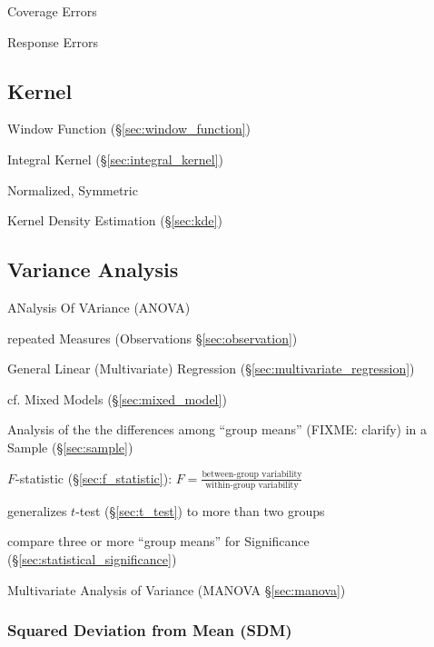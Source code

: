 Coverage Errors

Response Errors



\subsection{Kernel}\label{sec:distribution_kernel}

Window Function (\S\ref{sec:window_function})

\fist Integral Kernel (\S\ref{sec:integral_kernel})

Normalized, Symmetric

\fist Kernel Density Estimation (\S\ref{sec:kde})



\subsection{Variance Analysis}\label{sec:variance_analysis}

ANalysis Of VAriance (ANOVA)

repeated Measures (Observations \S\ref{sec:observation})

General Linear (Multivariate) Regression (\S\ref{sec:multivariate_regression})

cf. Mixed Models (\S\ref{sec:mixed_model})

Analysis of the the differences among ``group means'' (FIXME: clarify) in a
Sample (\S\ref{sec:sample})

$F$-statistic (\S\ref{sec:f_statistic}):
$F = \frac{\text{between-group variability}}{\text{within-group variability}}$

generalizes $t$-test (\S\ref{sec:t_test}) to more than two groups

compare three or more ``group means'' for Significance
(\S\ref{sec:statistical_significance})

\fist Multivariate Analysis of Variance (MANOVA \S\ref{sec:manova})



\subsubsection{Squared Deviation from Mean (SDM)}\label{sec:sdm}

